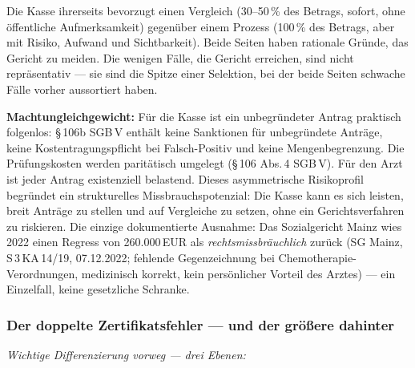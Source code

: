 \documentclass{umbruch-position}
\begin{document}
Die Kasse ihrerseits bevorzugt einen Vergleich (30--50\,\% des Betrags, sofort, ohne öffentliche Aufmerksamkeit) gegenüber einem Prozess (100\,\% des Betrags, aber mit Risiko, Aufwand und Sichtbarkeit). Beide Seiten haben rationale Gründe, das Gericht zu meiden. Die wenigen Fälle, die Gericht erreichen, sind nicht repräsentativ --- sie sind die Spitze einer Selektion, bei der beide Seiten schwache Fälle vorher aussortiert haben.

\textbf{Machtungleichgewicht:} Für die Kasse ist ein unbegründeter Antrag praktisch folgenlos: \S\,106b SGB\,V enthält keine Sanktionen für unbegründete Anträge, keine Kostentragungspflicht bei Falsch-Positiv und keine Mengenbegrenzung. Die Prüfungskosten werden paritätisch umgelegt (\S\,106 Abs.\,4 SGB\,V). Für den Arzt ist jeder Antrag existenziell belastend. Dieses asymmetrische Risikoprofil begründet ein strukturelles Missbrauchspotenzial: Die Kasse kann es sich leisten, breit Anträge zu stellen und auf Vergleiche zu setzen, ohne ein Gerichtsverfahren zu riskieren. Die einzige dokumentierte Ausnahme: Das Sozialgericht Mainz wies 2022 einen Regress von 260.000\,EUR als \textit{rechtsmissbräuchlich} zurück (SG Mainz, S\,3\,KA\,14/19, 07.12.2022; fehlende Gegenzeichnung bei Chemotherapie-Verordnungen, medizinisch korrekt, kein persönlicher Vorteil des Arztes) --- ein Einzelfall, keine gesetzliche Schranke.

\subsubsection{Der doppelte Zertifikatsfehler --- und der gr\"o\ss{}ere dahinter}

\noindent\textit{Wichtige Differenzierung vorweg --- drei Ebenen:}
\end{document}
